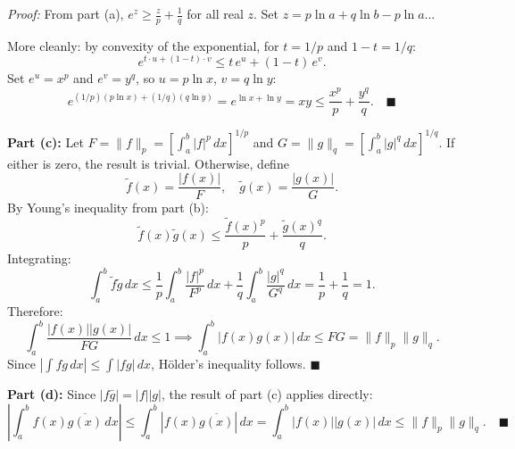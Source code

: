 \documentclass[12pt]{article}
\begin{document}
\textit{Proof:} From part (a), $e^z \ge \frac{z}{p} + \frac{1}{q}$ for all real $z$. Set $z = p\ln a + q\ln b - p\ln a$...

More cleanly: by convexity of the exponential, for $t = 1/p$ and $1-t = 1/q$:
\[
e^{t\cdot u + (1-t)\cdot v} \le t\,e^u + (1-t)\,e^v.
\]
Set $e^u = x^p$ and $e^v = y^q$, so $u = p\ln x$, $v = q\ln y$:
\[
e^{(1/p)(p\ln x)+(1/q)(q\ln y)} = e^{\ln x + \ln y} = xy \le \frac{x^p}{p}+\frac{y^q}{q}. \quad\blacksquare
\]

\textbf{Part (c):}
Let $F = \|f\|_p = \left[\int_a^b|f|^p\,dx\right]^{1/p}$ and $G = \|g\|_q = \left[\int_a^b|g|^q\,dx\right]^{1/q}$. If either is zero, the result is trivial. Otherwise, define
\[
\tilde{f}(x) = \frac{|f(x)|}{F}, \quad \tilde{g}(x) = \frac{|g(x)|}{G}.
\]
By Young's inequality from part (b):
\[
\tilde{f}(x)\tilde{g}(x) \le \frac{\tilde{f}(x)^p}{p} + \frac{\tilde{g}(x)^q}{q}.
\]
Integrating:
\[
\int_a^b \tilde{f}\tilde{g}\,dx \le \frac{1}{p}\int_a^b\frac{|f|^p}{F^p}\,dx + \frac{1}{q}\int_a^b\frac{|g|^q}{G^q}\,dx = \frac{1}{p}+\frac{1}{q}=1.
\]
Therefore:
\[
\int_a^b \frac{|f(x)||g(x)|}{FG}\,dx \le 1 \implies \int_a^b |f(x)g(x)|\,dx \le FG = \|f\|_p\|g\|_q.
\]
Since $\left|\int fg\,dx\right|\le\int|fg|\,dx$, H\"older's inequality follows. $\blacksquare$

\textbf{Part (d):}
Since $|f\bar{g}| = |f||g|$, the result of part (c) applies directly:
\[
\left|\int_a^b f(x)\overline{g(x)}\,dx\right| \le \int_a^b |f(x)\overline{g(x)}|\,dx = \int_a^b |f(x)||g(x)|\,dx \le \|f\|_p\|g\|_q. \quad\blacksquare
\]
\end{document}
